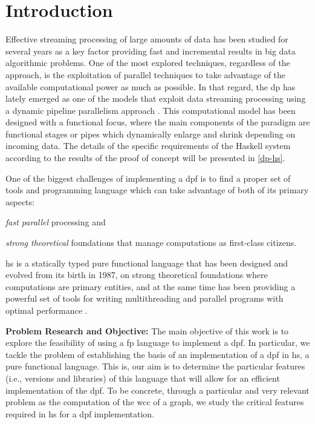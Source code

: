\section{Introduction}\label{intro}
Effective streaming processing of large amounts of data has been studied for several years \cite{enumeratingsg, exploiting, onthefly} 
as a key factor providing fast and incremental results in big data algorithmic problems. One of the most explored techniques, 
regardless of the approach, is the exploitation of parallel techniques to take advantage of the available computational power as much as possible. 
In that regard, the \acrfull{dp} \cite{dpdef} has lately emerged as one of the models that exploit data streaming processing using a dynamic pipeline parallelism approach \cite{onthefly}. 
This computational model has been designed with a functional focus, where the main components of the paradigm are functional stages or pipes which dynamically enlarge and shrink depending on incoming data.  
The details of the specific requirements of the Haskell system according to the results of the proof of concept will be presented in \autoref{dp-hs}.

One of the biggest challenges of implementing a \acrfull{dpf} is to find a proper set of tools and programming language which can take advantage of both of its primary aspects: \begin{inparaenum}[i\upshape)]
\item  \emph{fast parallel} processing and 
\item  \emph{strong theoretical} foundations that manage computations as first-class citizens.
 \end{inparaenum}
\acrfull{hs} is a statically typed pure functional language that has been designed and evolved from its birth in 1987, 
on strong theoretical foundations where computations are primary entities, and at the same time has been providing a powerful set of tools for writing multithreading and parallel programs with optimal performance \cite{parallelbook, monadpar}.

\textbf{Problem Research and Objective:}\label{research:obj} The main objective of this work is to explore the feasibility of using a  \acrfull{fp} language to implement a \acrshort{dpf}. In particular, we tackle the problem of establishing the basis of an implementation of a \acrshort{dpf}  in \acrshort{hs}, a pure functional language. 
This is,  our aim is to determine the particular features (i.e., versions and libraries) of this language that will allow for an efficient implementation of the \acrshort{dpf}. 
To be concrete, through a particular and very relevant problem as the computation of the \acrfull{wcc} of a graph,  we study the critical features required in \acrshort{hs} for a \acrshort{dpf} implementation.


